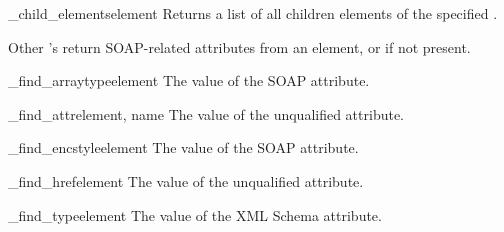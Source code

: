 \begin{funcdesc}{_child_elements}{element}
Returns a list of all children elements of the specified .
\end{funcdesc}

Other 's return SOAP-related attributes from an element,
or  if not present.

\begin{funcdesc}{_find_arraytype}{element}
The value of the SOAP  attribute.
\end{funcdesc}

\begin{funcdesc}{_find_attr}{element, name}
The value of the unqualified  attribute.
\end{funcdesc}

\begin{funcdesc}{_find_encstyle}{element}
The value of the SOAP  attribute.
\end{funcdesc}

\begin{funcdesc}{_find_href}{element}
The value of the unqualified  attribute.
\end{funcdesc}

\begin{funcdesc}{_find_type}{element}
The value of the XML Schema  attribute.
\end{funcdesc}

